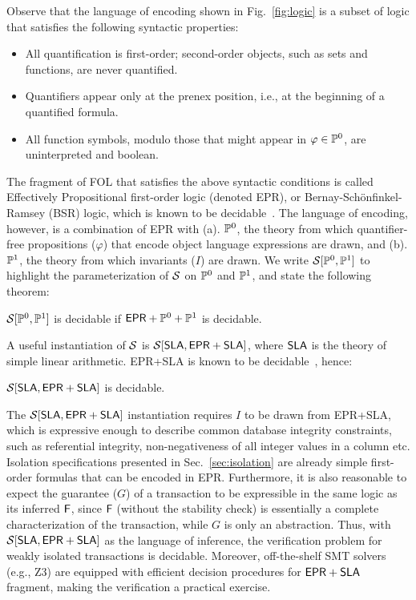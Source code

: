 Observe that the language of encoding shown in Fig.~\ref{fig:logic} is
a subset of logic that satisfies the following syntactic properties:
\begin{itemize}
  \item All quantification is first-order; second-order objects, such
    as sets and functions, are never quantified.
  \item Quantifiers appear only at the prenex position, i.e., at the
    beginning of a quantified formula.  
  \item All function symbols, modulo those that might appear in
    $\varphi\in\mathbb{P}^0$, are uninterpreted and boolean.
\end{itemize}
The fragment of FOL that satisfies the above syntactic conditions is
called Effectively Propositional first-order logic (denoted {\sf
EPR}), or Bernay-Sch{\"o}nfinkel-Ramsey (BSR) logic, which is known to
be decidable~\cite{z3epr}. The language of encoding, however, is a
combination of {\sf EPR} with (a). $\mathbb{P}^0$, the theory from which
quantifier-free propositions ($\varphi$) that encode object language
expressions are drawn, and (b).  $\mathbb{P}^1$, the theory from which
invariants ($I$) are drawn. We write $\mathcal{S}[\mathbb{P}^0,\mathbb{P}^1]$ to
highlight the parameterization of $\mathcal{S}$ on $\mathbb{P}^0$ and $\mathbb{P}^1$,
and state the following theorem:
\begin{theorem}
  $\mathcal{S}[\mathbb{P}^0,\mathbb{P}^1]$ is decidable if ${\sf EPR}+\mathbb{P}^0+\mathbb{P}^1$
  is decidable.
\end{theorem}
A useful instantiation of $\mathcal{S}$ is $\mathcal{S}[{\sf SLA},{\sf EPR}+{\sf
SLA}]$, where ${\sf SLA}$ is the theory of simple linear arithmetic.
{\sf EPR}+{\sf SLA} is known to be decidable~\cite{eprsla}, hence:
\begin{theorem}
  $\mathcal{S}[{\sf SLA},{\sf EPR}+{\sf SLA}]$ is decidable.
\end{theorem}
The $\mathcal{S}[{\sf SLA},{\sf EPR}+{\sf SLA}]$ instantiation requires $I$ to
be drawn from {\sf EPR}+{\sf SLA}, which is expressive enough to
describe common database integrity constraints, such as referential
integrity, non-negativeness of all integer values in a column etc.
Isolation specifications presented in Sec.~\ref{sec:isolation} are
already simple first-order formulas that can be encoded in {\sf EPR}.
Furthermore, it is also reasonable to expect the guarantee ($G$) of a
transaction to be expressible in the same logic as its inferred ${\sf F}$,
since ${\sf F}$ (without the stability check) is essentially a complete
characterization of the transaction, while $G$ is only an abstraction.
Thus, with $\mathcal{S}[{\sf SLA},{\sf EPR}+{\sf SLA}]$ as the language of
inference, the verification problem for weakly isolated transactions
is decidable. Moreover, off-the-shelf SMT solvers (e.g., Z3) are
equipped with efficient decision procedures for ${\sf EPR}+{\sf SLA}$
fragment, making the verification a practical exercise.

